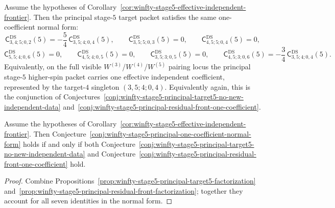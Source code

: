 \begin{conjecture}
\label{conj:winfty-stage5-principal-one-coefficient-normal-form}
\ClaimStatusConjectured{}
Assume the hypotheses of
Corollary~\ref{cor:winfty-stage5-effective-independent-frontier}.  Then
the principal stage-$5$ target packet satisfies the same one-coefficient
normal form:
\[
\mathsf{C}^{\mathrm{DS}}_{3,4;5;0,2}(5)
=
-\frac{5}{4}\,\mathsf{C}^{\mathrm{DS}}_{3,5;4;0,4}(5),
\qquad
\mathsf{C}^{\mathrm{DS}}_{3,5;5;0,3}(5)=0,
\qquad
\mathsf{C}^{\mathrm{DS}}_{4,5;5;0,4}(5)=0,
\]
\[
\mathsf{C}^{\mathrm{DS}}_{5,5;4;0,6}(5)=0,
\qquad
\mathsf{C}^{\mathrm{DS}}_{4,5;4;0,5}(5)=0,
\qquad
\mathsf{C}^{\mathrm{DS}}_{3,5;3;0,5}(5)=0,
\qquad
\mathsf{C}^{\mathrm{DS}}_{4,5;3;0,6}(5)
=
-\frac{3}{4}\,\mathsf{C}^{\mathrm{DS}}_{3,5;4;0,4}(5).
\]
Equivalently, on the full visible
\texorpdfstring{$W^{(3)}$}{W3}/\texorpdfstring{$W^{(4)}$}{W4}/\texorpdfstring{$W^{(5)}$}{W5}
pairing locus the principal stage-$5$ higher-spin packet carries one
effective independent coefficient, represented by the target-$4$
singleton \((3,5;4;0,4)\).  Equivalently again, this is the conjunction
of
Conjectures~\ref{conj:winfty-stage5-principal-target5-no-new-independent-data}
and~\ref{conj:winfty-stage5-principal-residual-front-one-coefficient}.
\end{conjecture}

\begin{proposition}
\label{prop:winfty-stage5-principal-one-coefficient-factorization}
Assume the hypotheses of
Corollary~\ref{cor:winfty-stage5-effective-independent-frontier}.  Then
Conjecture~\ref{conj:winfty-stage5-principal-one-coefficient-normal-form}
holds if and only if both
Conjecture~\ref{conj:winfty-stage5-principal-target5-no-new-independent-data}
and
Conjecture~\ref{conj:winfty-stage5-principal-residual-front-one-coefficient}
hold.
\end{proposition}

\begin{proof}
Combine Propositions~\ref{prop:winfty-stage5-principal-target5-factorization} and~\ref{prop:winfty-stage5-principal-residual-front-factorization}; together they account for all seven identities in the normal form.
\end{proof}

